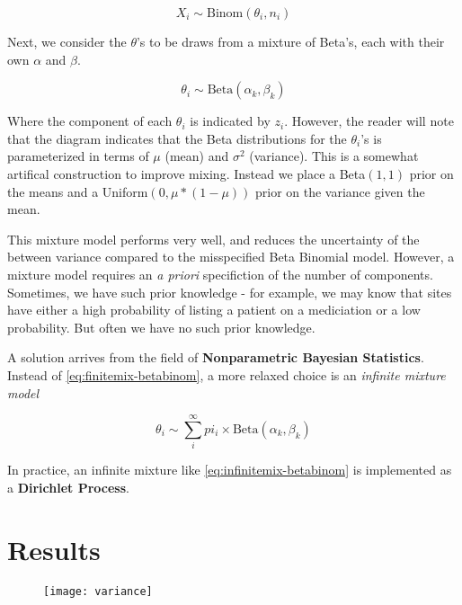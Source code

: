 \documentclass{article}
\begin{document}
\begin{equation}\label{eq:data}
    X_i \sim \text{Binom}(\theta_i, n_i)
\end{equation}

Next, we consider the $\theta$'s to be draws from a mixture of Beta's, each with their own $\alpha$ and $\beta$.

\begin{equation}\label{eq:theta}
    \theta_i \sim \text{Beta}(\alpha_k, \beta_k)
\end{equation}

Where the component of each $\theta_i$ is indicated by $z_i$. However, the reader will note that the diagram indicates that the Beta distributions for the $\theta_i$'s is parameterized in terms of $\mu$ (mean) and $\sigma^2$ (variance). This is a somewhat artifical construction to improve mixing. Instead we place a Beta$(1, 1)$ prior on the means and a Uniform$(0, \mu * (1-\mu))$ prior on the variance given the mean.

This mixture model performs very well, and reduces the uncertainty of the between variance compared to the misspecified Beta Binomial model. However, a mixture model requires an \textit{a priori} specifiction of the number of components. Sometimes, we have such prior knowledge - for example, we may know that sites have either a high probability of listing a patient on a mediciation or a low probability. But often we have no such prior knowledge. 

A solution arrives from the field of \textbf{Nonparametric Bayesian Statistics}. Instead of \eqref{eq:finitemix-betabinom}, a more relaxed choice is an \textit{infinite mixture model}

\begin{equation}\label{eq:infinitemix-betabinom}
\theta_i \sim \sum_i^{\infty} pi_i \times \text{Beta}(\alpha_k, \beta_k)
\end{equation}

In practice, an infinite mixture like \eqref{eq:infinitemix-betabinom} is implemented as a \textbf{Dirichlet Process}.




\section{Results}

\begin{figure}
\texttt{[image: variance]}
\end{figure}
\end{document}
